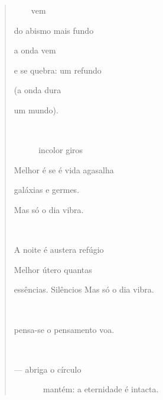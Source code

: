\begin{quote}
  vem

do abismo mais fundo

a onda vem

e se quebra: um refundo

(a onda dura

um mundo).



   incolor giros

Melhor é se é vida agasalha

galáxias e germes.

Mas só o dia vibra.



A noite é austera refúgio

Melhor útero quantas

essências. Silêncios Mas só o dia vibra.

 

pensa-se o pensamento voa.

 

--- abriga o círculo

   mantém: a eternidade é intacta.
\end{quote}

